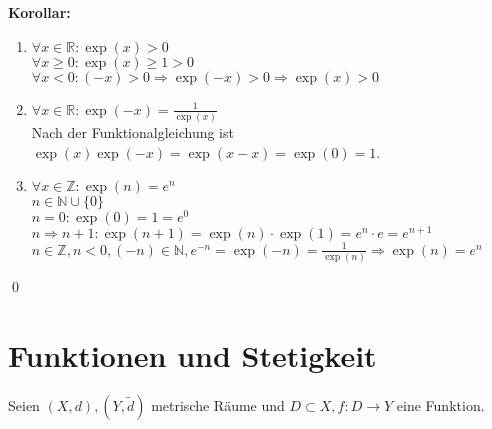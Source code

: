 \documentclass[ngerman,titlepage,twoside, parskip=half*]{scrreprt}
\newcommand*{\N}{\mathbb{N}}
\newcommand*{\Z}{\mathbb{Z}}
\newcommand*{\R}{\mathbb{R}}
\theoremstyle{plain}
\theoremstyle{definition}
\theoremstyle{remark}
\begin{document}
\textbf{Korollar:}
\begin{enumerate}[(1)]
  \item $\forall x \in \R \colon \exp(x)>0$\\
    $\forall x\geq 0\colon \exp(x)\geq 1>0$\\
    $\forall x<0\colon(-x)>0\Rightarrow \exp(-x)>0\Rightarrow \exp(x)>0$
  \item $\forall x\in \R \colon \exp(-x)=\frac{1}{\exp(x)}$\\
    Nach der Funktionalgleichung ist $\exp(x)\exp(-x)=\exp(x-x)=\exp(0)=1$.
  \item $\forall x \in \Z \colon \exp(n)=e^n$\\
    $n\in \N \cup \{0\}$\\
    $n=0\colon \exp(0)=1=e^0$\\
    $n\Rightarrow n+1\colon \exp(n+1)=\exp(n)\cdot \exp(1)=e^n\cdot e=e^{n+1}$\\
    $n\in \Z , n<0, (-n)\in \N, e^{-n}=\exp(-n)=\frac{1}{\exp(n)}\Rightarrow \exp(n)=e^n$
\end{enumerate}
\qed

\chapter{Funktionen und Stetigkeit}
Seien $(X,d), (Y,\tilde{d})$ metrische Räume und $D\subset X, f\colon D\rightarrow Y$ eine Funktion.
\end{document}
